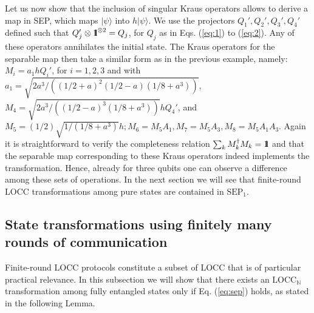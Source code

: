\documentclass[superscriptaddress,twocolumn]{revtex4}\usepackage[utf8]{inputenc}
\newcommand{\one}{\mbox{$1 \hspace{-1.0mm}  {\bf l}$}}
\newcommand{\N}{\mathbb{N}}
\newcommand{\ket}[1]{|#1\rangle}
\begin{document}
Let us now show that the inclusion of singular Kraus operators allows to derive a map in SEP, which maps $\ket{\psi}$ into $h\ket{\psi}$. We use the projectors $Q_1',Q_2',Q_3',Q_4'$ defined such that $Q_j'\otimes \one^{\otimes 2}=Q_j$, for $Q_j$ as in Eqs. (\ref{eq:1}) to (\ref{eq:2}). Any of these operators annihilates the initial state. The Kraus operators for the separable map then take a similar form as in the previous example, namely:
$M_i=a_1 hQ_i'$, for $i=1,2,3$ and with $a_1=\sqrt{2a^3/((1/2+a)^2(1/2-a)(1/8+a^3))}$, $M_4 =\sqrt{2a^3/((1/2-a)^3(1/8+a^3))} h Q_4'$, and $M_5=(1/2) \sqrt{1/(1/8+a^3)}h; M_6=M_5 A_1, M_7=M_5 A_3,M_8=M_5 A_1 A_3$. Again it is straightforward to verify the completeness relation $\sum_k M_k^\dagger M_k=\one$ and that the separable map corresponding to these Kraus operators indeed implements the transformation. Hence, already for three qubits one can observe a difference among these sets of operations.
In the next section we will see that finite-round LOCC transformations among pure states are contained in $\textrm{SEP}_1$.

\subsection{State transformations using finitely many rounds of communication }
Finite-round LOCC protocols constitute a subset of LOCC that is of particular practical relevance. In this subsection we will show that there exists an $\textrm{LOCC}_\N$ transformation among fully entangled states only if Eq. (\ref{eq:sep}) holds, as stated in the following Lemma.
\end{document}
